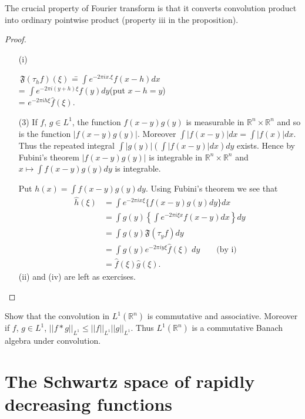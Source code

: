 \begin{remark*}
The crucial property of Fourier transform is that it converts
convolution product into ordinary pointwise product (property iii in
the proposition).
\end{remark*}

\begin{proof}
\begin{itemize}
\item[\rm(i)]\pageoriginale
\begin{tabbing}
\,\qquad\quad$\mathfrak{F}(\tau_{h}f)(\xi)$ \== $\int e^{-2\pi
    ix.\xi}f(x-h)dx$\\[3pt]
\>= $\int e^{-2\pi i(y+h)\xi}f(y)dy$\quad (put $x-h=y$)\\[3pt]
\>= $e^{-2\pi ih \xi}\widehat{f}(\xi)$.
\end{tabbing}

(3) If $f$, $g\in L^{1}$, the function $f(x-y)g(y)$ is measurable in
$\mathbb{R}^{n}\times \mathbb{R}^{n}$ and so is the function
$|f(x-y)g(y)|$. Moreover $\int |f(x-y)|dx=\int  |f(x)|dx$. Thus the
repeated integral $\int |g(y)|(\int |f(x-y)|dx)dy$ exists. Hence by
Fubini's theorem $|f(x-y)g(y)|$ is integrable in $\mathbb{R}^{n}\times
  \mathbb{R}^{n}$ and $x\mapsto \int f(x-y)g(y)dy$ is integrable.

Put $h(x)=\int f(x-y)g(y)dy$. Using Fubini's theorem we see that
\begin{align*}
\widehat{h}(\xi) &= \int e^{-2\pi ix\xi}\{f(x-y)g(y)dy\}dx\\[3pt]
&= \int g(y)\left\{\int e^{-2\pi i \xi x}f(x-y)dx\right\}dy\\[3pt]
&= \int g(y)\mathfrak{F}(\tau_{y}f)dy\\[3pt]
&= \int g(y)e^{-2\pi iy\xi}\widehat{f}(\xi)\; dy\quad \text{~~ (by
  i)}\\[3pt]
&= \widehat{f}(\xi)\widehat{g}(\xi).
\end{align*}
(ii) and (iv) are left as exercises.
\end{itemize}
\end{proof}

\begin{exer*}
Show that the convolution in $L^{1}(\mathbb{R}^{n})$ is commutative
and associative. Moreover if $f$, $g\in L^{1}$, $||f\ast
g||_{L^{1}}\leq ||f||_{L^{1}}||g||_{L^{1}}$. Thus
$L^{1}(\mathbb{R}^{n})$ is a commutative Banach algebra under convolution.
\end{exer*}

\section*{The Schwartz space of rapidly decreasing functions}

